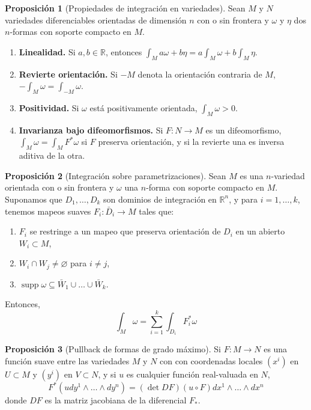 \documentclass[spanish]{article}
\theoremstyle{definition}
\newtheorem*{prop}{Proposición}
\newcommand{\R}{\mathbb{R}}
\DeclareMathOperator{\supp}{supp}
\begin{document}
	\begin{prop}[Propiedades de integración en variedades]
		Sean $M$ y $N$ variedades diferenciables orientadas de dimensión $n$ con o sin frontera y $\omega$ y $\eta$ dos $n$-formas con soporte compacto en $M$.
		\begin{enumerate}
			\item \textbf{Linealidad.} Si $a,b\in\R$, entonces $\int_Ma\omega+b\eta=a\int_M\omega+b\int_M\eta$.
			
			\item \textbf{Revierte orientación.} Si $-M$ denota la orientación contraria de $M$, $-\int_M\omega=\int_{-M}\omega$.
			
			\item \textbf{Positividad.} Si $\omega$ está positivamente orientada, $\int_M\omega>0$.
			
			\item \textbf{Invarianza bajo difeomorfismos.} Si $F:N\to M$ es un difeomorfismo, $\int_M\omega=\int_M F^*\omega$ si $F$ preserva orientación, y si la revierte una es inversa aditiva de la otra.
		\end{enumerate}
	\end{prop}
	\begin{prop}[Integración sobre parametrizaciones]
		Sean $M$ es una $n$-variedad orientada con o sin frontera y $\omega$ una $n$-forma con soporte compacto en $M$. Suponamos que $D_1,\ldots,D_k$ son dominios de integración en $\R^n$, y para $i=1,\ldots,k$, tenemos mapeos suaves $F_i:\bar{D}_i\to M$ tales que:
		\begin{enumerate}
			\item $F_i$ se restringe a un mapeo que preserva orientación de $D_i$ en un abierto $W_i\subset M$,
			\item $W_i\cap W_j\neq\varnothing$ para $i\neq j$,
			\item $\supp \omega\subseteq\bar{W}_1\cup\ldots\cup\bar{W}_k$.
		\end{enumerate}
		Entonces,
		\[\int_M\omega=\sum_{i=1}^k\int_{D_i}F^*_i\omega\]
	\end{prop}
	\begin{prop}[Pullback de formas de grado máximo]
		Si $F:M\to N$ es una función suave entre las variedades $M$ y $N$ con con coordenadas locales $(x^i)$ en $U\subset M$ y $(y^i)$ en $V\subset N$, y si $u$ es cualquier función real-valuada en $N$,
		\[F^*(udy^1\wedge\ldots\wedge dy^n)=(\det DF)(u\circ F)dx^1\wedge\ldots\wedge dx^n\]
		donde $DF$ es la matriz jacobiana de la diferencial $F_*$.
	\end{prop}
	
\end{document}
